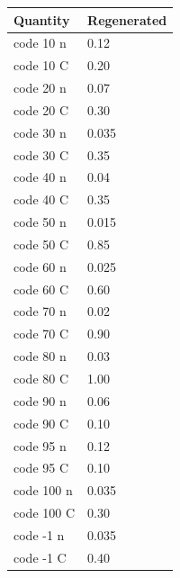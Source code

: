 \begin{tabular}{ll}
Quantity & Regenerated \\
\hline
code 10 n & 0.12 \\
code 10 C & 0.20 \\
code 20 n & 0.07 \\
code 20 C & 0.30 \\
code 30 n & 0.035 \\
code 30 C & 0.35 \\
code 40 n & 0.04 \\
code 40 C & 0.35 \\
code 50 n & 0.015 \\
code 50 C & 0.85 \\
code 60 n & 0.025 \\
code 60 C & 0.60 \\
code 70 n & 0.02 \\
code 70 C & 0.90 \\
code 80 n & 0.03 \\
code 80 C & 1.00 \\
code 90 n & 0.06 \\
code 90 C & 0.10 \\
code 95 n & 0.12 \\
code 95 C & 0.10 \\
code 100 n & 0.035 \\
code 100 C & 0.30 \\
code -1 n & 0.035 \\
code -1 C & 0.40 \\
\end{tabular}
